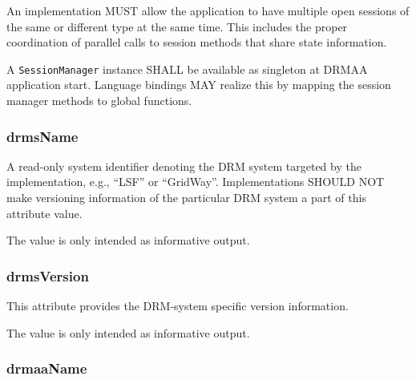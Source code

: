 \documentclass{article}
\newcommand{\h}[1]{\lstinline|#1|}
\newcommand{\langbind}[1]{\begin{shaded}#1\end{shaded}}
\newcommand{\rat}[1]{}
\begin{document}
An implementation MUST allow the application to have multiple open sessions of the same or different type at the same time. This includes the proper coordination of parallel calls to session methods that share state information.

\langbind{
A \h{SessionManager} instance SHALL be available as singleton at DRMAA application start. Language bindings MAY realize this by mapping the session manager methods to global functions.
}

\rat{
Comparison to DRMAA 1.0:
The concept of a factory from GFD.130 was removed (solves issue \#6276). Version 2.0 of DRMAA supports restartable sessions by the newly introduced SessionManager interface. It allows creating multiple concurrent sessions for job submission (solves issue \#2821), which can be restarted by their generated session name (solves issue \#2820). Session.init() and Session.exit() functionalities are moved to the according session creation and closing routines. The descriptions were fixed accordingly (solves issue \#2822). The AlreadyActiveSession error was removed. (F2F meeting July 2009) The drmaaImplementation attribute from DRMAA 1.0 was removed, since it was redundant to the drmsInfo attribute. This one is now available in the new SessionManager interface. (F2F meeting July 2009).

The possibility for surviving job / reservation objects on session closing was added after discussion in the Nov 30th 2011 conf call.
}

\subsubsection{drmsName}

A read-only system identifier denoting the DRM system targeted by the implementation, e.g., \enquote{LSF} or \enquote{GridWay}. Implementations SHOULD NOT make versioning information of the particular DRM system a part of this attribute value.

The value is only intended as informative output.

\subsubsection{drmsVersion}

This attribute provides the DRM-system specific version information.

The value is only intended as informative output.

\subsubsection{drmaaName}
\end{document}

